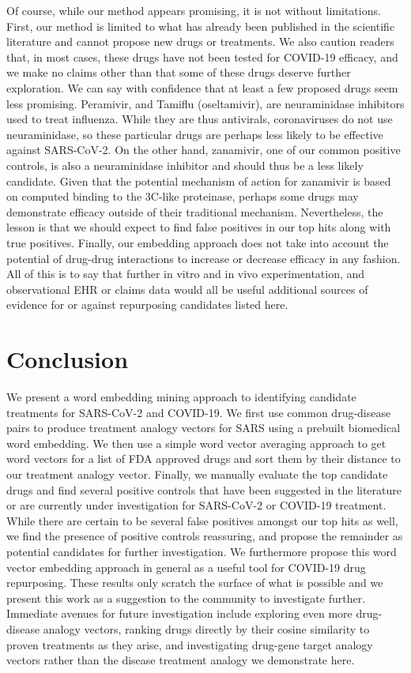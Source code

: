 \documentclass{article}
\begin{document}
Of course, while our method appears promising, it is not without limitations.
First, our method is limited to what has already been published in the scientific literature and cannot propose new drugs or treatments.
We also caution readers that, in most cases, these drugs have not been tested for COVID-19 efficacy, and we make no claims other than that some of these drugs deserve further exploration.
We can say with confidence that at least a few proposed drugs seem less promising.
Peramivir, and Tamiflu (oseltamivir), are neuraminidase inhibitors used to treat influenza.
While they are thus antivirals, coronaviruses do not use neuraminidase, so these particular drugs are perhaps less likely to be effective against SARS-CoV-2\cite{mccreary2020coronavirus}.
On the other hand, zanamivir, one of our common positive controls\cite{hall2020search}, is also a neuraminidase inhibitor and should thus be a less likely candidate.
Given that the potential mechanism of action for zanamivir is based on computed binding to the 3C-like proteinase, perhaps some drugs may demonstrate efficacy outside of their traditional mechanism.
Nevertheless, the lesson is that we should expect to find false positives in our top hits along with true positives.
Finally, our embedding approach does not take into account the potential of drug-drug interactions to increase or decrease efficacy in any fashion.
All of this is to say that further in vitro and in vivo experimentation, and observational EHR or claims data would all be useful additional sources of evidence for or against repurposing candidates listed here.


\section{Conclusion}

We present a word embedding mining approach to identifying candidate treatments for SARS-CoV-2 and COVID-19.
We first use common drug-disease pairs to produce treatment analogy vectors for SARS using a prebuilt biomedical word embedding.
We then use a simple word vector averaging approach to get word vectors for a list of FDA approved drugs and sort them by their distance to our treatment analogy vector.
Finally, we manually evaluate the top candidate drugs and find several positive controls that have been suggested in the literature or are currently under investigation for SARS-CoV-2 or COVID-19 treatment.
While there are certain to be several false positives amongst our top hits as well, we find the presence of positive controls reassuring, and propose the remainder as potential candidates for further investigation.
We furthermore propose this word vector embedding approach in general as a useful tool for COVID-19 drug repurposing.
These results only scratch the surface of what is possible and we present this work as a suggestion to the community to investigate further.
Immediate avenues for future investigation include exploring even more drug-disease analogy vectors, ranking drugs directly by their cosine similarity to proven treatments as they arise, and investigating drug-gene target analogy vectors rather than the disease treatment analogy we demonstrate here.



\end{document}
